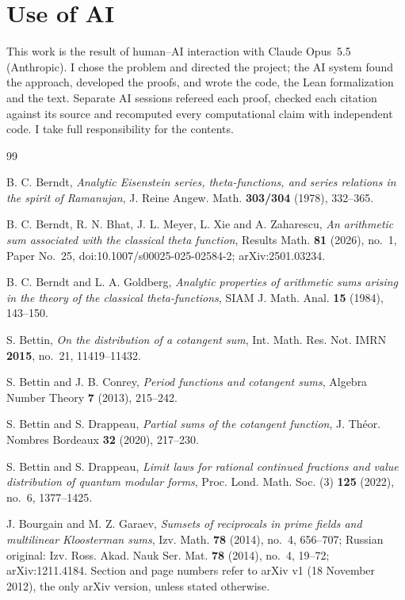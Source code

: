 \section*{Use of AI}

This work is the result of human--AI interaction with Claude Opus~5.5 (Anthropic). I chose the problem and directed the project; the AI system found the approach, developed the proofs, and wrote the code, the Lean formalization and the text. Separate AI sessions refereed each proof, checked each citation against its source and recomputed every computational claim with independent code. I take full responsibility for the contents.

\begin{thebibliography}{99}

 B. C. Berndt, \emph{Analytic Eisenstein series, theta-functions, and series relations in the spirit of Ramanujan}, J. Reine Angew. Math. \textbf{303/304} (1978), 332--365.

 B. C. Berndt, R. N. Bhat, J. L. Meyer, L. Xie and A. Zaharescu, \emph{An arithmetic sum associated with the classical theta function}, Results Math. \textbf{81} (2026), no.~1, Paper No.~25, doi:10.1007/s00025-025-02584-2; arXiv:2501.03234.

 B. C. Berndt and L. A. Goldberg, \emph{Analytic properties of arithmetic sums arising in the theory of the classical theta-functions}, SIAM J. Math. Anal. \textbf{15} (1984), 143--150.

 S. Bettin, \emph{On the distribution of a cotangent sum}, Int. Math. Res. Not. IMRN \textbf{2015}, no.~21, 11419--11432.

 S. Bettin and J. B. Conrey, \emph{Period functions and cotangent sums}, Algebra Number Theory \textbf{7} (2013), 215--242.

 S. Bettin and S. Drappeau, \emph{Partial sums of the cotangent function}, J. Th\'eor. Nombres Bordeaux \textbf{32} (2020), 217--230.

 S. Bettin and S. Drappeau, \emph{Limit laws for rational continued fractions and value distribution of quantum modular forms}, Proc. Lond. Math. Soc. (3) \textbf{125} (2022), no.~6, 1377--1425.

 J. Bourgain and M. Z. Garaev, \emph{Sumsets of reciprocals in prime fields and multilinear Kloosterman sums}, Izv. Math. \textbf{78} (2014), no.~4, 656--707; Russian original: Izv. Ross. Akad. Nauk Ser. Mat. \textbf{78} (2014), no.~4, 19--72; arXiv:1211.4184. Section and page numbers refer to arXiv v1 (18 November 2012), the only arXiv version, unless stated otherwise.


\end{thebibliography}
